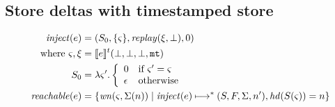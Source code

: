 \documentclass{llncs}
\newcommand{\finto}{\mathbin{\overset{\text{fin}}{\rightharpoonup}}}
\begin{document}

\subsection{Store deltas with timestamped store}

\begin{align*}
\mathit{inject}(e) &=
 (S_0, \{\varsigma\},
  \mathit{replay}(\xi,\bot), 0) \\
 \text{ where } \varsigma, \xi &= \llbracket e\rrbracket^{t}(\bot,\bot,\bot,{\tt mt}) \\
                S_0 &= \lambda\varsigma'.
                        \left\{\begin{array}{ll}
                         0 & \text{if } \varsigma' = \varsigma \\
                         \epsilon & \text{otherwise}
                        \end{array}\right. \\
\mathit{reachable}(e) &=
  \{\mathit{wn}(\varsigma,\Sigma(n)) \mid
         \mathit{inject}(e) \mathbin{\longmapsto}^* (S,F,\Sigma,n'), \mathit{hd}(S(\varsigma)) = n\}
\end{align*}
\end{document}
